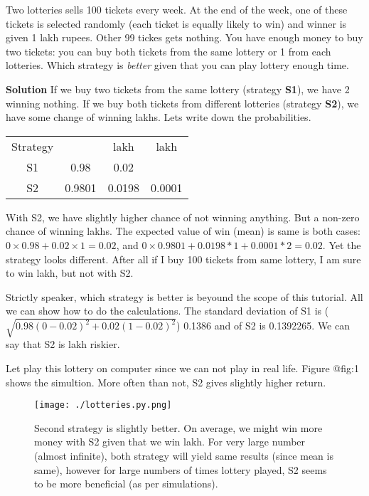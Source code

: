\documentclass[a4paper,10pt]{article}
\begin{document}
Two lotteries sells 100 tickets every week. At the end of the week, one of these
tickets is selected randomly (each ticket is equally likely to win) and winner
is given 1 lakh rupees. Other 99 tickes gets nothing. You have enough money to
buy two tickets: you can buy both tickets from the same lottery or 1 from each
lotteries. Which strategy is \textit{better} given that you can play lottery enough
time.

\textbf{Solution} If we buy two tickets from the same lottery (strategy
\textbf{S1}), we have 2%
winning nothing.  If we buy both tickets from different lotteries (strategy
\textbf{S2}), we have some change of winning  lakhs. Lets write down the
probabilities.

\begin{tabular}{c c c c}
Strategy                    & \rupee 0     & \rupee 1 lakh & \rupee 2 lakh \\
S1                          & 0.98         & 0.02          & \\
S2                          & 0.9801       & 0.0198        & 0.0001 \\
\end{tabular}

With S2, we have slightly higher chance of not winning anything. But a non-zero
chance of winning  lakhs. The expected value of win (mean) is same is
both cases: $0 \times 0.98 + 0.02 \times 1 = 0.02$, and $0\times 0.9801 + 0.0198
* 1 + 0.0001 * 2 = 0.02$. Yet the strategy looks different. After all if I buy
100 tickets from same lottery, I am sure to win  lakh, but not with S2.

Strictly speaker, which strategy is better is beyound the scope of this
tutorial. All we can show how to do the calculations.  The standard deviation of
S1 is ($\sqrt{0.98(0-0.02)^2+0.02(1-0.02)^2}$) 0.1386 and of S2 is
0.1392265. We can say that S2 is  lakh riskier.

Let play this lottery on computer since we can not play in real life.
Figure @fig:1 shows the simultion. More often than not, S2 gives slightly
higher return.

\begin{figure}[ht!]
    \texttt{[image: ./lotteries.py.png]}
    \caption{Second strategy is slightly better. On average, we might win more
        money with S2 given that we win  lakh. For very large number (almost
        infinite), both strategy will yield same results (since mean is same), however
        for large numbers of times lottery played, S2 seems to be more beneficial (as
    per simulations).}
    \label{fig:}
\end{figure}
\end{document}
